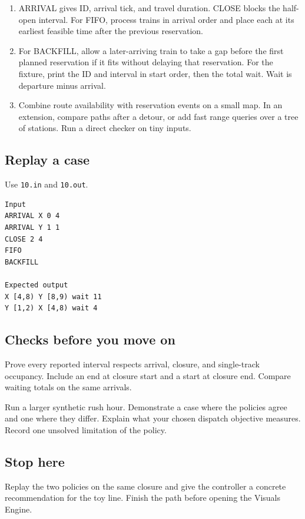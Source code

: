 \documentclass[11pt,letterpaper]{article}
\begin{document}
\begin{enumerate}
\item ARRIVAL gives ID, arrival tick, and travel duration. CLOSE blocks the half-open interval. For FIFO, process trains in arrival order and place each at its earliest feasible time after the previous reservation.
\item For BACKFILL, allow a later-arriving train to take a gap before the first planned reservation if it fits without delaying that reservation. For the fixture, print the ID and interval in start order, then the total wait. Wait is departure minus arrival.
\item Combine route availability with reservation events on a small map. In an extension, compare paths after a detour, or add fast range queries over a tree of stations. Run a direct checker on tiny inputs.
\end{enumerate}

\subsection*{Replay a case}

Use \texttt{10.in} and \texttt{10.out}.

\begin{samepage}
\small
\begin{verbatim}
Input
ARRIVAL X 0 4
ARRIVAL Y 1 1
CLOSE 2 4
FIFO
BACKFILL

Expected output
X [4,8) Y [8,9) wait 11
Y [1,2) X [4,8) wait 4
\end{verbatim}
\end{samepage}

\subsection*{Checks before you move on}

Prove every reported interval respects arrival, closure, and single-track occupancy. Include an end at closure start and a start at closure end. Compare waiting totals on the same arrivals.

Run a larger synthetic rush hour. Demonstrate a case where the policies agree and one where they differ. Explain what your chosen dispatch objective measures. Record one unsolved limitation of the policy.

\subsection*{Stop here}

Replay the two policies on the same closure and give the controller a concrete recommendation for the toy line. Finish the path before opening the Visuals Engine.
\end{document}

